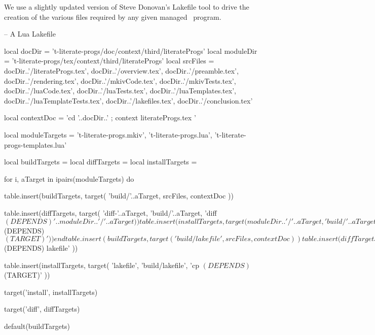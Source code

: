 
\startchapter[title=Lakefile]

We use a slightly updated version of Steve Donovan's Lakefile tool to 
drive the creation of the various files required by any given 
 managed \ConTeXt\ program. 


\startLakefile
-- A Lua Lakefile

local docDir    =
  't-literate-progs/doc/context/third/literateProgs'
local moduleDir =
  't-literate-progs/tex/context/third/literateProgs'
local srcFiles = {
  docDir..'/literateProgs.tex',
  docDir..'/overview.tex',
  docDir..'/preamble.tex',
  docDir..'/rendering.tex',
  docDir..'/mkivCode.tex',
  docDir..'/mkivTests.tex',
  docDir..'/luaCode.tex',
  docDir..'/luaTests.tex',
  docDir..'/luaTemplates.tex',
  docDir..'/luaTemplateTests.tex',
  docDir..'/lakefiles.tex',
  docDir..'/conclusion.tex'
}

local contextDoc = 
  'cd '..docDir..' ; context literateProgs.tex '

local moduleTargets = {
  't-literate-progs.mkiv',
  't-literate-progs.lua',
  't-literate-progs-templates.lua'
}

local buildTargets   = { }
local diffTargets    = { }
local installTargets = { }

for i, aTarget in ipairs(moduleTargets) do

  table.insert(buildTargets, target(
    'build/'..aTarget,
    srcFiles,
    contextDoc
  ))

  table.insert(diffTargets, target(
    'diff-'..aTarget,
    'build/'..aTarget,
    'diff $(DEPENDS) '..moduleDir..'/'..aTarget
  ))

  table.insert(installTargets, target(
    moduleDir..'/'..aTarget,
    'build/'..aTarget,
    'cp $(DEPENDS) $(TARGET)'
  ))
end

table.insert(buildTargets, target(
  'build/lakefile',
  srcFiles,
  contextDoc
))

table.insert(diffTargets, target(
  'diff-lakefile',
  'build/lakefile',
  'diff $(DEPENDS) lakefile'
))

table.insert(installTargets, target(
  'lakefile',
  'build/lakefile',
  'cp $(DEPENDS) $(TARGET)'
))

target('install', installTargets)

target('diff', diffTargets)

default(buildTargets)
\stopLakefile

\stopchapter